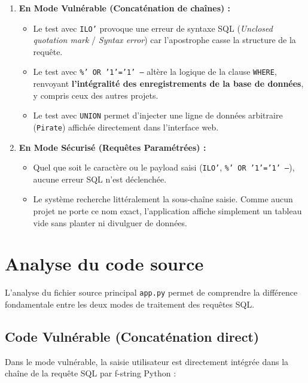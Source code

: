 \documentclass[12pt,a4paper]{article}
\begin{document}
\begin{enumerate}
    \item \textbf{En Mode Vulnérable (Concaténation de chaînes) :}
    \begin{itemize}
        \item Le test avec \texttt{ILO'} provoque une erreur de syntaxe SQL (\textit{Unclosed quotation mark} / \textit{Syntax error}) car l'apostrophe casse la structure de la requête.
        \item Le test avec \texttt{\%' OR '1'='1' --} altère la logique de la clause \texttt{WHERE}, renvoyant \textbf{l'intégralité des enregistrements de la base de données}, y compris ceux des autres projets.
        \item Le test avec \texttt{UNION} permet d'injecter une ligne de données arbitraire (\texttt{Pirate}) affichée directement dans l'interface web.
    \end{itemize}

    \item \textbf{En Mode Sécurisé (Requêtes Paramétrées) :}
    \begin{itemize}
        \item Quel que soit le caractère ou le payload saisi (\texttt{ILO'}, \texttt{\%' OR '1'='1' --}), aucune erreur SQL n'est déclenchée.
        \item Le système recherche littéralement la sous-chaîne saisie. Comme aucun projet ne porte ce nom exact, l'application affiche simplement un tableau vide sans planter ni divulguer de données.
    \end{itemize}
\end{enumerate}

\section{Analyse du code source}
L'analyse du fichier source principal \texttt{app.py} permet de comprendre la différence fondamentale entre les deux modes de traitement des requêtes SQL.

\subsection{Code Vulnérable (Concaténation direct)}
Dans le mode vulnérable, la saisie utilisateur est directement intégrée dans la chaîne de la requête SQL par f-string Python :
\end{document}
